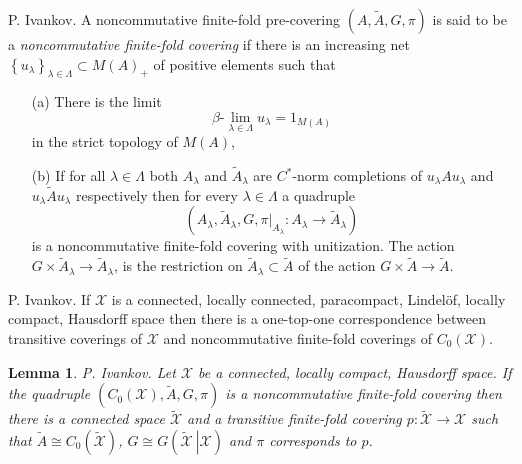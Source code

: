 \documentclass{beamer}
\theoremstyle{plain}
\newtheorem{lem}{Lemma}%
\newcommand{\sX}{\mathcal{X}}       %
\begin{document}
\begin{frame}
\begin{definition}
	\alert{P. Ivankov}.	A   noncommutative finite-fold  pre-covering $\left(A, \widetilde{A}, G, \pi \right)$ is said to be  a \textit{noncommutative finite-fold covering} if there is an increasing net $\left\{u_\lambda\right\}_{\lambda\in\Lambda}\subset M\left( A\right)_+ $  of positive elements such that
	\begin{enumerate}
		\item[(a)] There is the limit 
		$$
		\beta\text{-}\lim_{\lambda \in \Lambda} u_\lambda = 1_{M\left(A \right) }
		$$
		in the strict topology of $M\left(A \right)$,
		\item[(b)]  If for all   $\lambda\in\Lambda$ both $A_\lambda$ and  $\widetilde A_\lambda$ are $C^*$-norm completions  of $u_\lambda A u_\lambda$ and  $u_\lambda\widetilde{A}u_\lambda$ respectively then for every $\lambda\in\Lambda$ a quadruple
		$$
		\left(A_\lambda, \widetilde{A}_\lambda, G, \left.\pi\right|_{A_\lambda} :A_\lambda\to \widetilde{A}_\lambda\right)	
		$$
		is a noncommutative finite-fold covering with unitization. The action 	$G \times \widetilde{A}_\lambda\to \widetilde{A}_\lambda$, is the restriction on $\widetilde{A}_\lambda\subset \widetilde{   A}$ of the action $G\times  \widetilde{A}\to \widetilde{A}$.
	\end{enumerate}
	
\end{definition}
\end{frame}
\begin{frame}

\begin{theorem}
	\alert{P. Ivankov}. 
If $\mathcal X$ is a connected, locally connected, paracompact, Lindel\"{o}f, locally compact, Hausdorff space then there is a one-top-one correspondence between transitive coverings of  $\mathcal X$ and noncommutative finite-fold coverings of $C_0\left( \mathcal X\right)$. 
\end{theorem}

	\begin{lem}
		\alert{P. Ivankov}. 	Let $\mathcal X$ be a connected, locally compact, Hausdorff space.
		If the  quadruple $\left(C_0\left(\mathcal  X \right), \widetilde{A}, G,    \pi\right)$ is a noncommutative finite-fold covering then there is a connected space $\widetilde{   \mathcal X }$ and a transitive finite-fold covering  $p: \widetilde{   \mathcal X } \to \sX$ such that $\widetilde{A} \cong C_0\left( \widetilde{   \mathcal X }\right)$, $G \cong G\left(\left. \widetilde{   \mathcal X } ~\right| {   \mathcal X }\right)$ and $\pi$ corresponds to $p$.
	\end{lem}
\end{frame}
\end{document}
